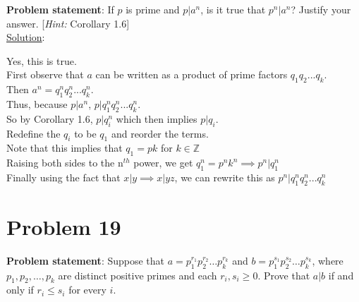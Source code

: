 \documentclass{article} %
\begin{document}
\textbf{Problem statement}: If $p$ is prime and $p|a^n$, is it true that $p^n|a^n$?  Justify your answer. [\textit{Hint:} Corollary 1.6]
\\

\underline{Solution}: 
\begin{addmargin}[1em]{0em}
Yes, this is true.
\\First observe that $a$ can be written as a product of prime factors $q_1q_2 ... q_k$.
\\Then $a^n = q_1^nq_2^n ... q_k^n$.
\\Thus, because $p|a^n$, $p|q_1^nq_2^n ... q_k^n$.
\\So by Corollary 1.6, $p|q_i^n$ which then implies $p|q_i$.
\\Redefine the $q_i$ to be $q_1$ and reorder the terms.
\\Note that this implies that $q_1 = pk$ for $k \in \mathbb{Z}$
\\Raising both sides to the n$^{th}$ power, we get $q_1^n = p^nk^n \implies p^n|q_1^n$
\\Finally using the fact that $x|y \implies x|yz$, we can rewrite this as $p^n|q_1^nq_2^n ... q_k^n$
\end{addmargin}

\newpage

\section*{Problem 19}


\textbf{Problem statement}: Suppose that $a = p_1^{r_1}p_2^{r_2} \ldots p_k^{r_k}$ and $b = p_1^{s_1}p_2^{s_2} \ldots p_k^{s_k}$, where $p_1,p_2,\ldots,p_k$ are distinct positive primes and each $r_i,s_i \geq 0$.  Prove that $a|b$ if and only if $r_i \leq s_i$ for every $i$.
\\
\end{document}
